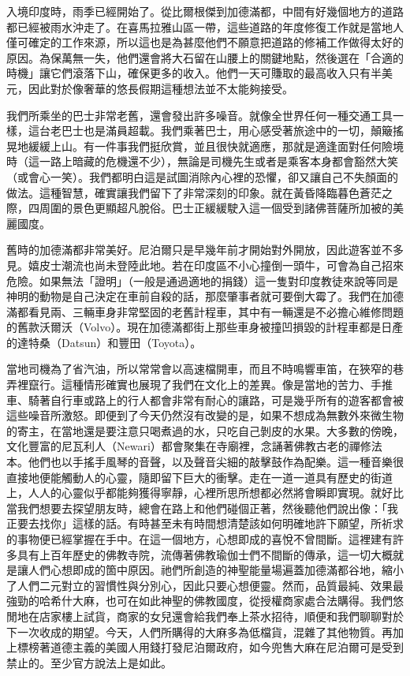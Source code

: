 入境印度時，雨季已經開始了。從比爾根傑到加德滿都，中間有好幾個地方的道路都已經被雨水沖走了。在喜馬拉雅山區一帶，這些道路的年度修復工作就是當地人僅可確定的工作來源，所以這也是為甚麼他們不願意把道路的修補工作做得太好的原因。為保萬無一失，他們還會將大石留在山腰上的關鍵地點，然後選在「合適的時機」讓它們滾落下山，確保更多的收入。他們一天可賺取的最高收入只有半美元，因此對於像奢華的悠長假期這種想法並不太能夠接受。

我們所乘坐的巴士非常老舊，還會發出許多噪音。就像全世界任何一種交通工具一樣，這台老巴士也是滿員超載。我們乘著巴士，用心感受著旅途中的一切，顛簸搖晃地緩緩上山。有一件事我們挺欣賞，並且很快就適應，那就是適逢面對任何險境時（這一路上暗藏的危機還不少），無論是司機先生或者是乘客本身都會豁然大笑（或會心一笑）。我們都明白這是試圖消除內心裡的恐懼，卻又讓自己不失顏面的做法。這種智慧，確實讓我們留下了非常深刻的印象。就在黃昏降臨暮色蒼茫之際，四周圍的景色更顯超凡脫俗。巴士正緩緩駛入這一個受到諸佛菩薩所加被的美麗國度。

舊時的加德滿都非常美好。尼泊爾只是早幾年前才開始對外開放，因此遊客並不多見。嬉皮士潮流也尚未登陸此地。若在印度區不小心撞倒一頭牛，可會為自己招來危險。如果無法「證明」（一般是通過適地的捐錢）這一隻對印度教徒來說等同是神明的動物是自己決定在車前自殺的話，那麼肇事者就可要倒大霉了。我們在加德滿都看見兩、三輛車身非常堅固的老舊計程車，其中有一輛還是不必擔心維修問題的舊款沃爾沃（Volvo）。現在加德滿都街上那些車身被撞凹損毀的計程車都是日產的達特桑（Datsun）和豐田（Toyota）。

當地司機為了省汽油，所以常常會以高速檔開車，而且不時鳴響車笛，在狹窄的巷弄裡竄行。這種情形確實也展現了我們在文化上的差異。像是當地的苦力、手推車、騎著自行車或路上的行人都會非常有耐心的讓路，可是幾乎所有的遊客都會被這些噪音所激怒。即便到了今天仍然沒有改變的是，如果不想成為無數外來微生物的寄主，在當地還是要注意只喝煮過的水，只吃自己剝皮的水果。大多數的傍晚，文化豐富的尼瓦利人（Newari）都會聚集在寺廟裡，念誦著佛教古老的禪修法本。他們也以手搖手風琴的音聲，以及聲音尖細的敲擊鼓作為配樂。這一種音樂很直接地便能觸動人的心靈，隨即留下巨大的衝擊。走在一道一道具有歷史的街道上，人人的心靈似乎都能夠獲得寧靜，心裡所思所想都必然將會瞬即實現。就好比當我們想要去探望朋友時，總會在路上和他們碰個正著，然後聽他們說出像：「我正要去找你」這樣的話。有時甚至未有時間想清楚該如何明確地許下願望，所祈求的事物便已經掌握在手中。在這一個地方，心想即成的喜悅不曾間斷。這裡建有許多具有上百年歷史的佛教寺院，流傳著佛教瑜伽士們不間斷的傳承，這一切大概就是讓人們心想即成的箇中原因。祂們所創造的神聖能量場遍蓋加德滿都谷地，縮小了人們二元對立的習慣性與分別心，因此只要心想便靈。然而，品質最純、效果最強勁的哈希什大麻，也可在如此神聖的佛教國度，從授權商家處合法購得。我們悠閒地在店家樓上試貨，商家的女兒還會給我們奉上茶水招待，順便和我們聊聊對於下一次收成的期望。今天，人們所購得的大麻多為低檔貨，混雜了其他物質。再加上標榜著道德主義的美國人用錢打發尼泊爾政府，如今兜售大麻在尼泊爾可是受到禁止的。至少官方說法上是如此。

